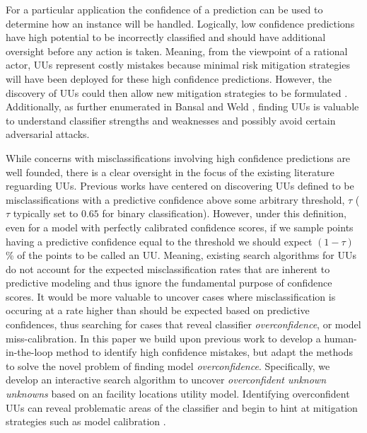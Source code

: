 \documentclass[10pt, conference]{IEEEtran}
\begin{document}
For a particular application the confidence of a prediction can be used to determine how an instance will be handled.  Logically, low confidence predictions have high potential to be incorrectly classified and should have additional oversight before any action is taken.  Meaning, from the viewpoint of a rational actor, UUs represent costly mistakes because minimal risk mitigation strategies will have been deployed for these high confidence predictions.  However, the discovery of UUs could then allow new mitigation strategies to be formulated \cite{Nushi2016a}. Additionally, as further enumerated in Bansal and Weld \cite{Bansal2018}, finding UUs is valuable to understand classifier strengths and weaknesses and possibly avoid certain adversarial attacks.

While concerns with misclassifications involving high confidence predictions are well founded, there is a clear oversight in the focus of the existing literature reguarding UUs. Previous works have centered on discovering UUs defined to be misclassifications with a predictive confidence above some arbitrary threshold, $\tau$ ($\tau$ typically set to $0.65$ for binary classification). However, under this definition, even for a model with perfectly calibrated confidence scores, if we sample points having a predictive confidence equal to the threshold we should expect $(1-\tau)$\% of the points to be called an UU. Meaning, existing search algorithms for UUs do not account for the expected misclassification rates that are inherent to predictive modeling and thus ignore the fundamental purpose of confidence scores.  It would be more valuable to uncover cases where misclassification is occuring at a rate higher than should be expected based on predictive confidences, thus searching for cases that reveal classifier \textit{overconfidence}, or model miss-calibration. In this paper we build upon previous work to develop a human-in-the-loop method to identify high confidence mistakes, but adapt the methods to solve the novel problem of finding model \textit{overconfidence}. Specifically, we develop an interactive search algorithm to uncover \textit{overconfident unknown unknowns} based on an facility locations utility model. Identifying overconfident UUs can reveal problematic areas of the classifier and begin to hint at mitigation strategies such as model calibration \cite{bella2010calibration}.  
\end{document}
